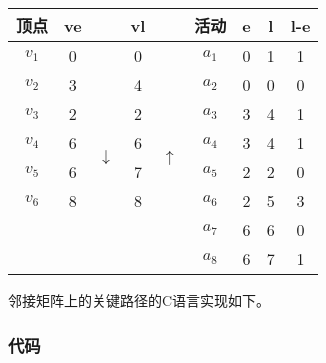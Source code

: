 \begin{center}
\label{tab:criticalpath}
\begin{tabular}{|ccccc|cccc|}
\hline
\textbf{顶点} & \textbf{ve} & & \textbf{vl} & & \textbf{活动} & \textbf{e} & \textbf{l} & \textbf{l-e} \\
\hline
$v_1$ & 0 & \multirow{8}{*}{$\downarrow$} & 0 & \multirow{8}{*}{$\uparrow$} & $a_1$ & 0 & 1 & 1 \\
$v_2$ & 3 &                               & 4 &                             & $a_2$ & 0 & 0 & 0 \\
$v_3$ & 2 &                               & 2 &                             & $a_3$ & 3 & 4 & 1 \\
$v_4$ & 6 &                               & 6 &                             & $a_4$ & 3 & 4 & 1 \\
$v_5$ & 6 &                               & 7 &                             & $a_5$ & 2 & 2 & 0 \\
$v_6$ & 8 &                               & 8 &                             & $a_6$ & 2 & 5 & 3 \\
      &   &                               &   &                             & $a_7$ & 6 & 6 & 0 \\
      &   &                               &   &                             & $a_8$ & 6 & 7 & 1 \\
\hline
\end{tabular}
\end{center}


邻接矩阵上的关键路径的C语言实现如下。

\subsubsection{代码}

